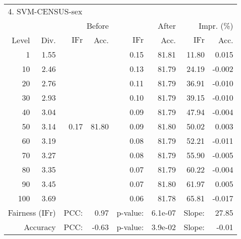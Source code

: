\begin{tabular}{rr||rr|rr|rr}
\multicolumn{4}{l}{4. SVM-CENSUS-sex} & \multicolumn{2}{c}{} & \multicolumn{2}{c}{}\\
 &  & \multicolumn{2}{r|}{Before} & \multicolumn{2}{r|}{After} & \multicolumn{2}{r}{Impr. (\%)}\\
Level & Div. & $\mathrm{IFr}$ & Acc. & $\mathrm{IFr}$ & Acc. & $\mathrm{IFr}$ & Acc.\\
\hline
1 & 1.55 & \multirow{11}{*}{0.17} & \multirow{11}{*}{81.80} & 0.15 & 81.81 & 11.80 & 0.015\\
10 & 2.46 &  &  & 0.13 & 81.79 & 24.19 & -0.002\\
20 & 2.76 &  &  & 0.11 & 81.79 & 36.91 & -0.010\\
30 & 2.93 &  &  & 0.10 & 81.79 & 39.15 & -0.010\\
40 & 3.04 &  &  & 0.09 & 81.79 & 47.94 & -0.004\\
50 & 3.14 &  &  & 0.09 & 81.80 & 50.02 & 0.003\\
60 & 3.19 &  &  & 0.08 & 81.79 & 52.21 & -0.011\\
70 & 3.27 &  &  & 0.08 & 81.79 & 55.90 & -0.005\\
80 & 3.35 &  &  & 0.07 & 81.79 & 60.22 & -0.004\\
90 & 3.45 &  &  & 0.07 & 81.80 & 61.97 & 0.005\\
100 & 3.69 &  &  & 0.06 & 81.78 & 65.81 & -0.017\\
\hline
\multicolumn{2}{r}{Fairness ($\mathrm{IFr}$)} & PCC: & \multicolumn{1}{r}{0.97} & p-value:  & \multicolumn{1}{r}{6.1e-07} & Slope:  & 27.85\\
\multicolumn{2}{r}{Accuracy} & PCC: & \multicolumn{1}{r}{-0.63} & p-value:  & \multicolumn{1}{r}{3.9e-02} & Slope:  & -0.01\\
\end{tabular}